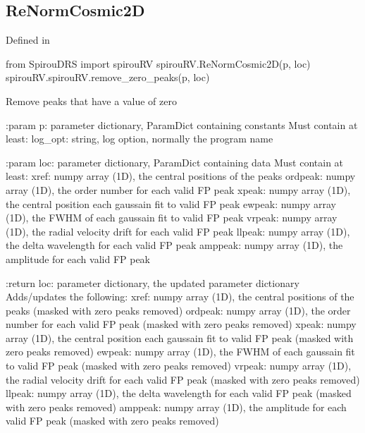\begin{minipage}{\textwidth}
\subsection{ReNormCosmic2D}

Defined in \spirouRV{}

\begin{pythonbox}
from SpirouDRS import spirouRV
spirouRV.ReNormCosmic2D(p, loc)
spirouRV.spirouRV.remove_zero_peaks(p, loc)
\end{pythonbox}

\begin{pythondocstring}
Remove peaks that have a value of zero

:param p: parameter dictionary, ParamDict containing constants
    Must contain at least:
            log_opt: string, log option, normally the program name

:param loc: parameter dictionary, ParamDict containing data
        Must contain at least:
            xref: numpy array (1D), the central positions of the peaks
            ordpeak: numpy array (1D), the order number for each valid FP
                     peak
            xpeak: numpy array (1D), the central position each gaussain fit
                   to valid FP peak
            ewpeak: numpy array (1D), the FWHM of each gaussain fit
                    to valid FP peak
            vrpeak: numpy array (1D), the radial velocity drift for each
                    valid FP peak
            llpeak: numpy array (1D), the delta wavelength for each valid
                    FP peak
            amppeak: numpy array (1D), the amplitude for each valid FP peak

:return loc: parameter dictionary, the updated parameter dictionary
        Adds/updates the following:
            xref: numpy array (1D), the central positions of the peaks
                  (masked with zero peaks removed)
            ordpeak: numpy array (1D), the order number for each valid FP
                     peak (masked with zero peaks removed)
            xpeak: numpy array (1D), the central position each gaussain fit
                   to valid FP peak (masked with zero peaks removed)
            ewpeak: numpy array (1D), the FWHM of each gaussain fit
                    to valid FP peak (masked with zero peaks removed)
            vrpeak: numpy array (1D), the radial velocity drift for each
                    valid FP peak (masked with zero peaks removed)
            llpeak: numpy array (1D), the delta wavelength for each valid
                    FP peak (masked with zero peaks removed)
            amppeak: numpy array (1D), the amplitude for each valid FP peak
                     (masked with zero peaks removed)
\end{pythondocstring}
\end{minipage}

